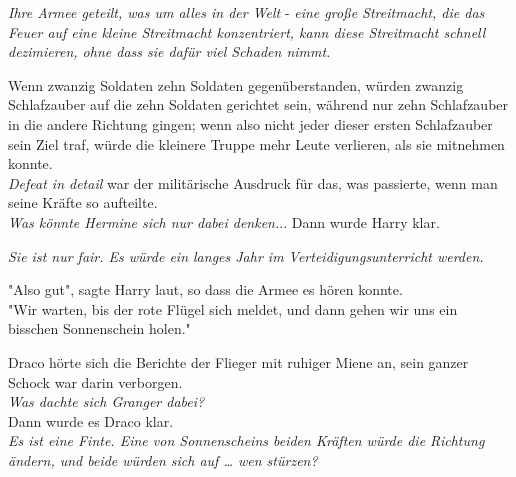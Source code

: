 {\emph{Ihre Armee geteilt, was um alles in der Welt} - \emph{eine große Streitmacht, die das Feuer auf eine kleine Streitmacht konzentriert, kann diese Streitmacht schnell dezimieren, ohne dass sie dafür viel Schaden nimmt.}

Wenn zwanzig Soldaten zehn Soldaten gegenüberstanden, würden zwanzig Schlafzauber auf die zehn Soldaten gerichtet sein, während nur zehn Schlafzauber in die andere Richtung gingen; wenn also nicht jeder dieser ersten Schlafzauber sein Ziel traf, würde die kleinere Truppe mehr Leute verlieren, als sie mitnehmen konnte.\\ \emph{Defeat in detail} war der militärische Ausdruck für das, was passierte, wenn man seine Kräfte so aufteilte.\\ \emph{Was könnte Hermine sich nur dabei denken.}.. Dann wurde Harry klar.

\emph{Sie ist nur fair. Es würde ein langes Jahr im Verteidigungsunterricht werden.}

"Also gut", sagte Harry laut, so dass die Armee es hören konnte.\\ "Wir warten, bis der rote Flügel sich meldet, und dann gehen wir uns ein bisschen Sonnenschein holen."

Draco hörte sich die Berichte der Flieger mit ruhiger Miene an, sein ganzer Schock war darin verborgen.\\ \emph{Was dachte sich Granger dabei?}\\ Dann wurde es Draco klar.\\ \emph{Es ist eine Finte. Eine von Sonnenscheins beiden Kräften würde die Richtung ändern, und beide würden sich auf … wen stürzen?}

}
